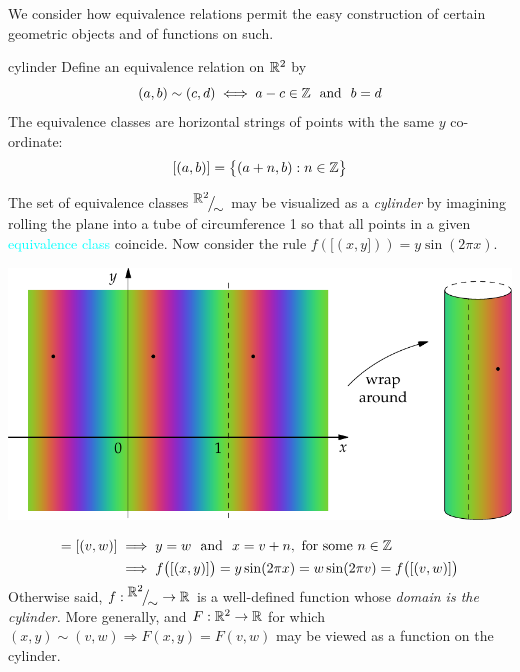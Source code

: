 
We consider how equivalence relations permit the easy construction of certain geometric objects and of functions on such.

\begin{examples}{}{cylinder}
	\exstart Define an equivalence relation on $\mathbb{R}^2$ by
	\[
		(a,b)\sim (c,d)\iff a-c\in\Z \ \text{ and }\ b=d
	\]
	The equivalence classes are horizontal strings of points with the same $y$ co-ordinate:
	\[
		[(a,b)]=\bigl\{(a+n,b):n\in\mathbb{Z}\bigr\}
	\]
	\begin{enumerate}\setcounter{enumi}{1}
	  \begin{minipage}[t]{0.53\linewidth}\vspace{-15pt}
			\item[]The set of equivalence classes $\smash[t]{{}^{\textstyle {\mathbb{R}^2}}\!\big/_{\textstyle \!{\sim}}}$ may be visualized as a \emph{cylinder} by imagining rolling the plane into a tube of circumference 1 so that all points in a given \textcolor{cyan}{equivalence class} coincide.\footnotemark\medbreak
			Now consider the rule $f([(x,y]))=y\sin(2\pi x)$. %
		\end{minipage}
		\hfill
		\begin{minipage}[t]{0.45\linewidth}\vspace{-50pt}
			\hfill\includegraphics[scale=0.85]{relations-13-cylinder}
		\end{minipage}
		\par\vspace{-19pt}
		\begin{align*}
	  	[(x,y)]=[(v,w)]
	  	&\implies y=w\ \text{ and }\ x=v+n,\text{ for some $n\in\Z$}\\
	  	&\implies f\bigl([(x,y)]\bigr) =y\sin(2\pi x) =w\sin(2\pi v) =f\bigl([(v,w)]\bigr)
	  \end{align*}
	  Otherwise said, $f:\smash{{}^{\textstyle {\mathbb{R}^2}}\!\big/_{\textstyle \!{\sim}}}\to\mathbb{R}$ is a well-defined function whose \emph{domain is the cylinder.} More generally, and $F:\mathbb{R}^2\to\mathbb{R}$ for which $(x,y)\sim(v,w)\Longrightarrow F(x,y)=F(v,w)$ may be viewed as a function on the cylinder.
	   

\end{enumerate}
\end{examples}
